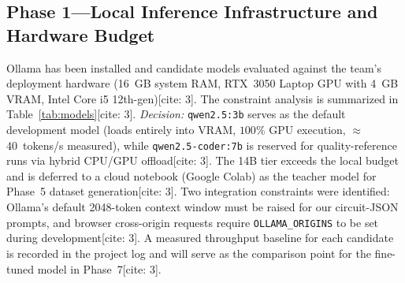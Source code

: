 \documentclass[conference]{IEEEtran}
\begin{document}
\subsection{Phase 1---Local Inference Infrastructure and Hardware Budget}
Ollama has been installed and candidate models evaluated against the team's deployment hardware (16~GB system RAM, RTX~3050 Laptop GPU with 4~GB VRAM, Intel Core i5 12th-gen)[cite: 3]. The constraint analysis is summarized in Table~\ref{tab:models}[cite: 3]. \emph{Decision:} \texttt{qwen2.5:3b} serves as the default development model (loads entirely into VRAM, $100\%$ GPU execution, $\approx$40~tokens/s measured), while \texttt{qwen2.5-coder:7b} is reserved for quality-reference runs via hybrid CPU/GPU offload[cite: 3]. The 14B tier exceeds the local budget and is deferred to a cloud notebook (Google Colab) as the teacher model for Phase~5 dataset generation[cite: 3]. Two integration constraints were identified: Ollama's default 2048-token context window must be raised for our circuit-JSON prompts, and browser cross-origin requests require \texttt{OLLAMA\_ORIGINS} to be set during development[cite: 3]. A measured throughput baseline for each candidate is recorded in the project log and will serve as the comparison point for the fine-tuned model in Phase~7[cite: 3].

\begin{table}[htbp]
\caption{Candidate Model Evaluation Under Hardware Budget (16~GB RAM, RTX~3050 4~GB VRAM, GGUF Q4\_K\_M Quantizations)}
\label{tab:models}
\centering
{}
\end{table}
\end{document}
